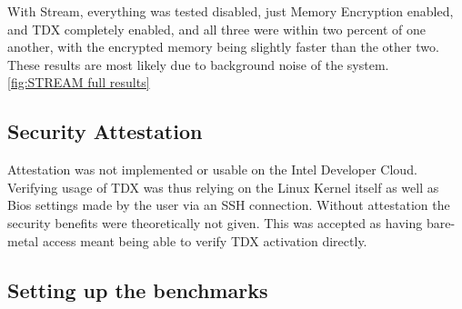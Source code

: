 With Stream, everything was tested disabled, just Memory Encryption enabled, and TDX completely enabled, and all three were within two percent of one another, with the encrypted memory being slightly faster than the other two. These results are most likely due to background noise of the system. \ref{fig:STREAM full results}

\begin{table}[]
    \centering
    \caption{Comparison of Memory Access speed using STREAM for various Non-VM settings as well as legacy VMs and TD}
\end{table}

\subsection{Security Attestation}

Attestation was not implemented or usable on the Intel Developer Cloud. Verifying usage of TDX was thus relying on the Linux Kernel itself as well as Bios settings made by the user via an SSH connection. Without attestation the security benefits were theoretically not given. This was accepted as having bare-metal access meant being able to verify TDX activation directly.


\subsection{Setting up the benchmarks}
\label{sec:SecondContent:SecondSection}

